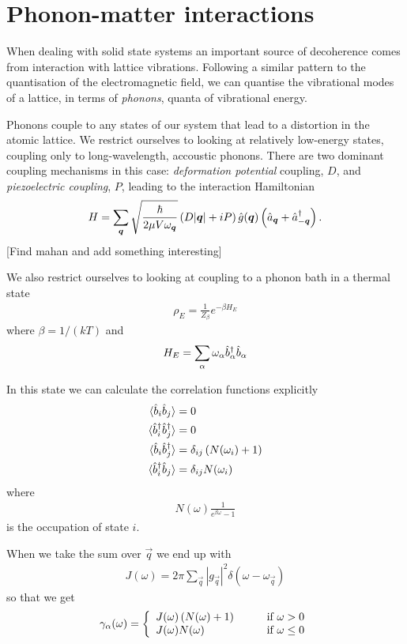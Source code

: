 \section{Phonon-matter interactions}

When dealing with solid state systems an important source of decoherence comes from interaction with lattice vibrations. Following a similar pattern to the quantisation of the electromagnetic field, we can quantise the vibrational modes of a lattice, in terms of \textit{phonons}, quanta of vibrational energy.

Phonons couple to any states of our system that lead to a distortion in the atomic lattice. We restrict ourselves to looking at relatively low-energy states, coupling only to long-wavelength, accoustic phonons. There are two dominant coupling mechanisms in this case: \textit{deformation potential} coupling, $D$, and \textit{piezoelectric coupling}, $P$, \cite{mahan} leading to the interaction Hamiltonian
\begin{align}
  H = \sum_{{\boldsymbol{q}}} \sqrt{\frac{\hbar}{2\mu V\omega_{{\boldsymbol{q}}}}} \left(D \vert {\boldsymbol{q}}\vert + iP \right)\hat{g}({\boldsymbol{q}})\left(\hat{a}_{{\boldsymbol{q}}} + \hat{a}^\dagger_{-{\boldsymbol{q}}} \right).
\end{align}
[Find mahan and add something interesting]

We also restrict ourselves to looking at coupling to a phonon bath in a thermal state
\begin{align}
  \rho_E = \frac{1}{Z_\beta} e^{-\beta H_E}
\end{align}
where $\beta = 1/(kT)$ and
\begin{align}
  H_E = \sum_\alpha \omega_\alpha \hat{b}^\dagger_\alpha \hat{b}_\alpha
\end{align}

In this state we can calculate the correlation functions explicitly
\begin{align}
  \langle \hat{b}_i \hat{b}_j \rangle &= 0 \\
  \langle \hat{b}^\dagger_i \hat{b}^\dagger_j \rangle &= 0 \\
  \langle \hat{b}_i \hat{b}^\dagger_j \rangle &= \delta_{ij} \left( N(\omega_i) +1 \right) \\
  \langle \hat{b}^\dagger_i \hat{b}_j \rangle &= \delta_{ij} N(\omega_i)
\end{align}
where
\begin{align}
  N(\omega) \frac{1}{e^{\beta \omega} - 1}
\end{align}
is the occupation of state $i$.

When we take the sum over $\vec{q}$ we end up with 
\begin{align}
  J(\omega) = 2\pi \sum_\vec{q} |g_\vec{q}|^2 \delta(\omega-\omega_\vec{q})
\end{align}
so that we get
\begin{align}
  \gamma_\alpha(\omega) = \left\{
    \begin{array}{l l}
    J(\omega)\left(N(\omega) + 1\right) & \qquad \text{if $\omega > 0$}\\
    J(\omega)N(\omega) & \qquad \text{if $\omega \leq 0$}
  \end{array} \right.
\end{align}



